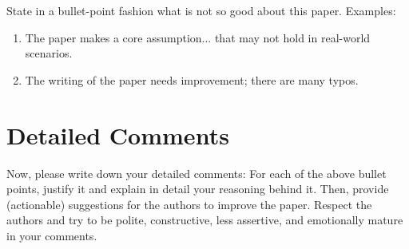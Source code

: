 \documentclass{../upb-cn}
\begin{document}
State in a bullet-point fashion what is not so good about this paper. Examples:

\begin{enumerate}
    \item The paper makes a core assumption... that may not hold in real-world scenarios.
    \item The writing of the paper needs improvement; there are many typos.
\end{enumerate}

\section{Detailed Comments}

Now, please write down your detailed comments: For each of the above bullet points, justify it and explain in detail your reasoning behind it. Then, provide (actionable) suggestions for the authors to improve the paper. Respect the authors and try to be polite, constructive, less assertive, and emotionally mature in your comments. 

\newpage


\end{document}
